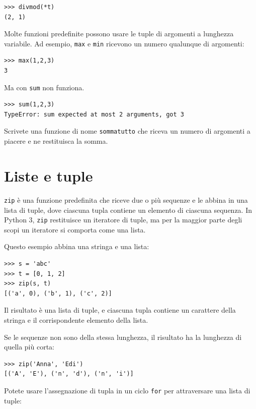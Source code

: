 \documentclass[10pt]{book}
\begin{document}
\begin{verbatim}
>>> divmod(*t)
(2, 1)
\end{verbatim}
%
\vspace{0.2in}
\begin{exercise}

Molte funzioni predefinite possono usare le tuple di argomenti a lunghezza variabile. Ad esempio, {\tt max} e {\tt min} ricevono un numero qualunque di argomenti:

\begin{verbatim}
>>> max(1,2,3)
3
\end{verbatim}
%
Ma con {\tt sum} non funziona.

\begin{verbatim}
>>> sum(1,2,3)
TypeError: sum expected at most 2 arguments, got 3
\end{verbatim}
%
Scrivete una funzione di nome {\tt sommatutto} che riceva un numero di argomenti a piacere e ne restituisca la somma.

\end{exercise}


\section{Liste e tuple}

{\tt zip} è una funzione predefinita che riceve due o più sequenze e le abbina in una lista di tuple, dove ciascuna tupla contiene un elemento di ciascuna sequenza.  In Python 3, {\tt zip} restituisce un iteratore di tuple, ma per la maggior parte degli scopi un iteratore si comporta come una lista.

Questo esempio abbina una stringa e una lista:

\begin{verbatim}
>>> s = 'abc'
>>> t = [0, 1, 2]
>>> zip(s, t)
[('a', 0), ('b', 1), ('c', 2)]
\end{verbatim}
%
Il risultato è una lista di tuple, e ciascuna tupla contiene un carattere della stringa e il corrispondente elemento della lista.

Se le sequenze non sono della stessa lunghezza, il risultato ha la lunghezza di quella più corta:

\begin{verbatim}
>>> zip('Anna', 'Edi')
[('A', 'E'), ('n', 'd'), ('n', 'i')]
\end{verbatim}
%
Potete usare l'assegnazione di tupla in un ciclo {\tt for} per attraversare una lista di tuple:
\end{document}
